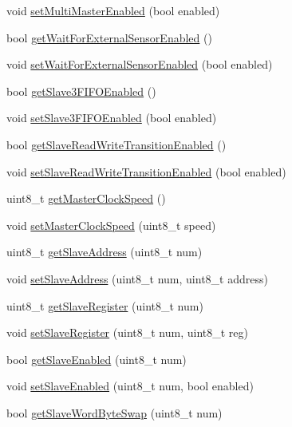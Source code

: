 \begin{DoxyCompactItemize}
\item 
void \mbox{\hyperlink{classMPU6050_a039f5724974c5bf3f373ed9be031441c}{set\+Multi\+Master\+Enabled}} (bool enabled)
\item 
bool \mbox{\hyperlink{classMPU6050_a4e2ebda47b85b4c5463f041c790bf5c0}{get\+Wait\+For\+External\+Sensor\+Enabled}} ()
\item 
void \mbox{\hyperlink{classMPU6050_a20dc4bdedbe1550580c28a6d090291be}{set\+Wait\+For\+External\+Sensor\+Enabled}} (bool enabled)
\item 
bool \mbox{\hyperlink{classMPU6050_a9d75ec63e2320ecfb84a2b082397f900}{get\+Slave3\+F\+I\+F\+O\+Enabled}} ()
\item 
void \mbox{\hyperlink{classMPU6050_a6ed713870c7f6d085ded91a45515a36c}{set\+Slave3\+F\+I\+F\+O\+Enabled}} (bool enabled)
\item 
bool \mbox{\hyperlink{classMPU6050_a6b3c3aab80fcaa384303f9df2a59d7eb}{get\+Slave\+Read\+Write\+Transition\+Enabled}} ()
\item 
void \mbox{\hyperlink{classMPU6050_a3413efbf2f4e8a27aa8768d9bc34d663}{set\+Slave\+Read\+Write\+Transition\+Enabled}} (bool enabled)
\item 
uint8\+\_\+t \mbox{\hyperlink{classMPU6050_a4cda448ef5c5736bd14188947342d636}{get\+Master\+Clock\+Speed}} ()
\item 
void \mbox{\hyperlink{classMPU6050_a8a4779ea709ff0633f9798369478400b}{set\+Master\+Clock\+Speed}} (uint8\+\_\+t speed)
\item 
uint8\+\_\+t \mbox{\hyperlink{classMPU6050_af75b9f7ccac48515c7544238db0e6863}{get\+Slave\+Address}} (uint8\+\_\+t num)
\item 
void \mbox{\hyperlink{classMPU6050_a3c07eb2c59fff3ddc7186319ee40ba6f}{set\+Slave\+Address}} (uint8\+\_\+t num, uint8\+\_\+t address)
\item 
uint8\+\_\+t \mbox{\hyperlink{classMPU6050_ae7e9ead9645bcef326eb579c6ab5d5ff}{get\+Slave\+Register}} (uint8\+\_\+t num)
\item 
void \mbox{\hyperlink{classMPU6050_a62851e982059a2462d52c210ad764a1c}{set\+Slave\+Register}} (uint8\+\_\+t num, uint8\+\_\+t reg)
\item 
bool \mbox{\hyperlink{classMPU6050_a5f14bde83fe00b27dec6776fc44e89c2}{get\+Slave\+Enabled}} (uint8\+\_\+t num)
\item 
void \mbox{\hyperlink{classMPU6050_afaffa021d7bb41f3a288827080602eee}{set\+Slave\+Enabled}} (uint8\+\_\+t num, bool enabled)
\item 
bool \mbox{\hyperlink{classMPU6050_a18e8f3d053a68f0e5ecf497c87ecac8a}{get\+Slave\+Word\+Byte\+Swap}} (uint8\+\_\+t num)

\end{DoxyCompactItemize}
